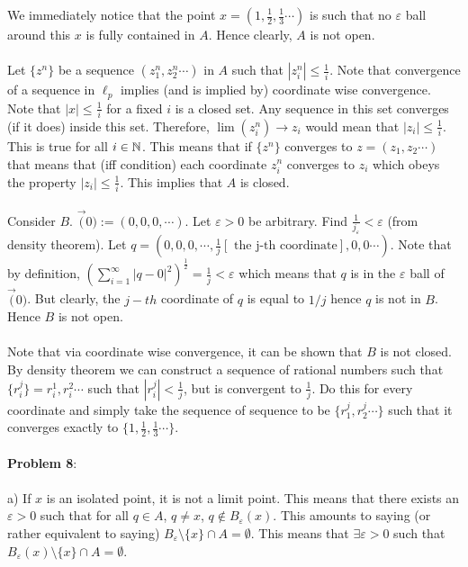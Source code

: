 \documentclass[../Main.tex]{subfiles}
\begin{document}
We immediately notice that the point $x=(1,\frac{1}{2},\frac{1}{3}\cdots)$ is such that no $\varepsilon$ ball around this $x$ is fully contained in $A$. Hence clearly, $A$ is not open. 
\\\\ Let $\{z^n\}$ be a sequence $(z^n_1,z^n_2 \cdots)$ in $A$ such that $|z^n_i|\leq \frac{1}{i}$. Note that convergence of a sequence in $\ell_p$ implies (and is implied by) coordinate wise convergence. Note that $|x|\leq \frac{1}{i}$ for a fixed $i$ is a closed set. Any sequence in this set converges (if it does) inside this set. Therefore, $\lim(z^n_i) \to z_i$ would mean that $|z_i|\leq \frac{1}{i}$. This is true for all $i \in \mathbb N$. This means that if $\{z^n\}$ converges to $z=(z_1,z_2 \cdots)$ that means that (iff condition) each coordinate $z^n_i$ converges to $z_i$ which obeys the property $|z_i|\leq \frac{1}{i}$. This implies that $A$ is closed.
\\\\ Consider $B$. $\vec(0):=(0,0,0, \cdots)$. Let $\varepsilon>0$ be arbitrary. Find $\frac{1}{j_{\varepsilon}}<\varepsilon$ (from density theorem). Let $q=(0,0,0, \cdots , \frac{1}{j} [\text{ the j-th coordinate}], 0, 0 \cdots)$. Note that by definition, $(\sum_{i=1}^{\infty}|q-0|^2)^{\frac{1}{2}}=\frac{1}{j}<\varepsilon$ which means that $q$ is in the $\varepsilon$ ball of $\vec(0)$. But clearly, the $j-th $ coordinate of $q$ is equal to $1/j$ hence $q$ is not in $B$. Hence $B$ is not open.
\\\\ Note that via coordinate wise convergence, it can be shown that $B$ is not closed. By density theorem we can construct a sequence of rational numbers such that $\{r^j_i\}=r^1_i,r^2_i \cdots $ such that $|r^j_i|<\frac{1}{j}$, but is convergent to $\frac{1}{j}$. Do this for every coordinate and simply take the sequence of sequence to be $\{r^j_1,r^j_2 \cdots\}$ such that it converges exactly to $\{1,\frac{1}{2},\frac{1}{3} \cdots \}$.
\\\\ \textbf{Problem 8}:
\\\\ a) If $x$ is an isolated point, it is not a limit point. This means that there exists an $\varepsilon>0$ such that for all $q \in A$, $q \neq x$, $q \not \in B_{\varepsilon}(x)$. This amounts to saying (or rather equivalent to saying) $B_{\varepsilon}\setminus\{x\} \cap A = \emptyset $. This means that $\exists \varepsilon>0$ such that $B_{\varepsilon}(x)\setminus\{x\} \cap A=\emptyset$.
\end{document}

